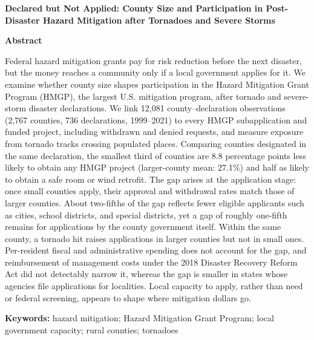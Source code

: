 \documentclass[12pt]{article}
\begin{document}
\thispagestyle{empty}
\begin{center}
\vspace*{2in}
{\Large\bfseries Declared but Not Applied: County Size and Participation in Post-Disaster Hazard Mitigation after Tornadoes and Severe Storms\par}
\end{center}
\clearpage

\doublespacing
\noindent\textbf{Abstract}

\noindent Federal hazard mitigation grants pay for risk reduction before the next disaster, but the money reaches a community only if a local government applies for it. We examine whether county size shapes participation in the Hazard Mitigation Grant Program (HMGP), the largest U.S. mitigation program, after tornado and severe-storm disaster declarations. We link 12,081 county--declaration observations (2,767 counties, 736 declarations, 1999--2021) to every HMGP subapplication and funded project, including withdrawn and denied requests, and measure exposure from tornado tracks crossing populated places. Comparing counties designated in the same declaration, the smallest third of counties are 8.8 percentage points less likely to obtain any HMGP project (larger-county mean: 27.1\%) and half as likely to obtain a safe room or wind retrofit. The gap arises at the application stage: once small counties apply, their approval and withdrawal rates match those of larger counties. About two-fifths of the gap reflects fewer eligible applicants such as cities, school districts, and special districts, yet a gap of roughly one-fifth remains for applications by the county government itself. Within the same county, a tornado hit raises applications in larger counties but not in small ones. Per-resident fiscal and administrative spending does not account for the gap, and reimbursement of management costs under the 2018 Disaster Recovery Reform Act did not detectably narrow it, whereas the gap is smaller in states whose agencies file applications for localities. Local capacity to apply, rather than need or federal screening, appears to shape where mitigation dollars go.

\vspace{12pt}
\noindent\textbf{Keywords:} hazard mitigation; Hazard Mitigation Grant Program; local government capacity; rural counties; tornadoes
\clearpage
\end{document}
